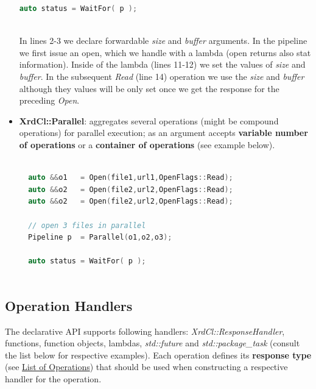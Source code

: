 \documentclass{article}
\begin{document}
\begin{itemize}
\begin{lstlisting}[language=C++, xleftmargin=\dimexpr-\leftmargini]
  auto status = WaitFor( p );
  
\end{lstlisting}
	            In lines 2-3 we declare forwardable \textit{size} and \textit{buffer} arguments. In the pipeline we first issue an open, which we handle
	            with a lambda (open returns also stat information). Inside of the lambda (lines 11-12) we set the values of \textit{size} and \textit{buffer}.
	            In the subsequent \textit{Read} (line 14) operation we use the \textit{size} and \textit{buffer} although they values will be only set once
	            we get the response for the preceding \textit{Open}. 
		  
		  \item \textbf{XrdCl::Parallel}: aggregates several operations (might be compound operations) for parallel execution; as an argument accepts \textbf{variable 
		  		number of operations} or a \textbf{container of operations} (see example below).
	  		
\begin{lstlisting}[language=C++, xleftmargin=\dimexpr-\leftmargini]
		
  auto &&o1   = Open(file1,url1,OpenFlags::Read);
  auto &&o2   = Open(file2,url2,OpenFlags::Read);
  auto &&o2   = Open(file2,url2,OpenFlags::Read);
  
  // open 3 files in parallel
  Pipeline p  = Parallel(o1,o2,o3);
  
  auto status = WaitFor( p );
  
\end{lstlisting}

		\end{itemize}
		
	\subsection{Operation Handlers}
	
		The declarative API supports following handlers: \textit{XrdCl::ResponseHandler}, functions, function objects, lambdas, \textit{std::future} and 
		\textit{std::package_task} (consult the list below for respective examples). Each operation defines its \textbf{response type} (see \hyperref[sec:lsop]	
        {List of Operations}) that should be used when constructing a respective handler for the operation.
\end{document}
